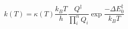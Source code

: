 \documentclass[preprint, 11pt]{elsarticle} %
\begin{document}

\begin{equation}
    k(T) = \kappa(T) \frac{k_B T}{h} \frac{Q^\ddagger}{\prod^{n}_{i} Q_i} \exp{\frac{-\Delta E^{\ddagger}_{0}}{k_B T}}
    \label{eyring:2}
\end{equation}
\end{document}
